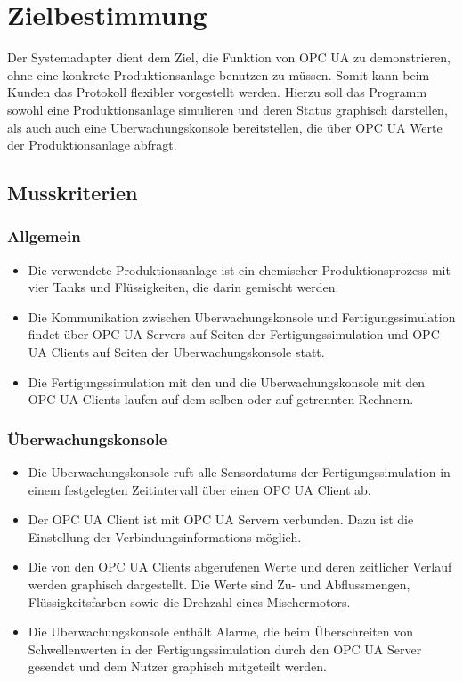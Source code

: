 \documentclass[parskip=full]{scrartcl}
\begin{document}
\pagebreak
\section{Zielbestimmung}
Der \gls{Systemadapter} dient dem Ziel, die Funktion von \gls{OPC UA} zu demonstrieren, ohne eine konkrete \gls{Produktionsanlage}
benutzen zu müssen. Somit kann beim Kunden das Protokoll flexibler vorgestellt werden. Hierzu soll das Programm
sowohl eine \gls{Produktionsanlage} simulieren und deren Status graphisch darstellen, als auch auch eine \gls{Uberwachungskonsole}
bereitstellen, die über \gls{OPC UA} Werte der \gls{Produktionsanlage} abfragt.\\

\subsection{Musskriterien}
\subsubsection{Allgemein}
\begin{itemize}
  \item Die verwendete \gls{Produktionsanlage} ist ein chemischer Produktionsprozess mit vier Tanks und Flüssigkeiten, die darin gemischt werden.
  \item Die Kommunikation zwischen \gls{Uberwachungskonsole} und \gls{Fertigungssimulation} findet \"uber \glspl{OPC UA Server} auf Seiten der \gls{Fertigungssimulation}
    und \glspl{OPC UA Client} auf Seiten der \gls{Uberwachungskonsole} statt.
  \item Die \gls{Fertigungssimulation} mit den  und die \gls{Uberwachungskonsole} mit den \glspl{OPC UA Client} laufen auf dem selben oder auf getrennten Rechnern.
\end{itemize}

\subsubsection{Überwachungskonsole}
\begin{itemize}
  \item Die \gls{Uberwachungskonsole} ruft alle \glspl{Sensordatum} der \gls{Fertigungssimulation} in einem festgelegten Zeitintervall über einen \gls{OPC UA} Client ab.
  \item Der \gls{OPC UA} Client ist mit \gls{OPC UA} Servern verbunden. Dazu ist die Einstellung der \glspl{Verbindungsinformation} möglich.
  \item Die von den \glspl{OPC UA Client} abgerufenen Werte und deren zeitlicher Verlauf werden graphisch dargestellt. Die Werte sind Zu- und Abflussmengen,
    Flüssigkeitsfarben sowie die Drehzahl eines Mischermotors.
  \item Die \gls{Uberwachungskonsole} enthält Alarme, die beim Überschreiten von Schwellenwerten in der \gls{Fertigungssimulation} durch den \gls{OPC UA} Server gesendet
    und dem Nutzer graphisch mitgeteilt werden.
\end{itemize}
\end{document}
